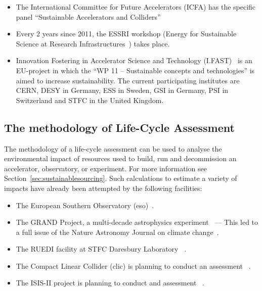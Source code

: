 \documentclass[../SustainableHEP.tex]{subfiles}
\begin{document}
\begin{itemize}

    \item The International Committee for Future Accelerators (ICFA) has the specific panel “Sustainable Accelerators and Colliders”~\cite{SustainableAcceleratorsICFA}
    
    \item Every 2 years since 2011, the ESSRI workshop (Energy for Sustainable Science at Research Infrastructures~\cite{ESSRI5}) takes place.
    
    \item Innovation Fostering in Accelerator Science and Technology (I.FAST)~\cite{IFAST} is an EU-project in which the “WP 11 – Sustainable concepts and technologies” is aimed to increase sustainability. The current participating institutes are CERN, DESY in Germany, ESS in Sweden, GSI in Germany, PSI in Switzerland and STFC in the United Kingdom.

\end{itemize}


\subsection{The methodology of Life-Cycle Assessment}

The methodology of a life-cycle assessment can be used to analyse the environmental impact of resources used to build, run and decommission an accelerator, observatory, or experiment.  For more information see Section~\ref{sec:sustainablesourcing}.  Such calculations to estimate a variety of impacts have already been attempted by the following facilities:
\begin{itemize}
    \item The European Southern Observatory (\acrshort{eso})~\cite{ESO}.
    \item The GRAND Project, a multi-decade astrophysics experiment~\cite{Aujoux_2021} --- This led to a full issue of the Nature Astronomy Journal on climate change~\cite{NatureClimateIssue}.
    \item The RUEDI facility at STFC Daresbury Laboratory ~\cite{Shepard}.
    \item The Compact Linear Collider (\acrshort{clic}) is planning to conduct an assessment ~\cite{privateBList}.
    \item The ISIS-II project is planning to conduct and assessment ~\cite{ISISII}.
\end{itemize}
\end{document}

